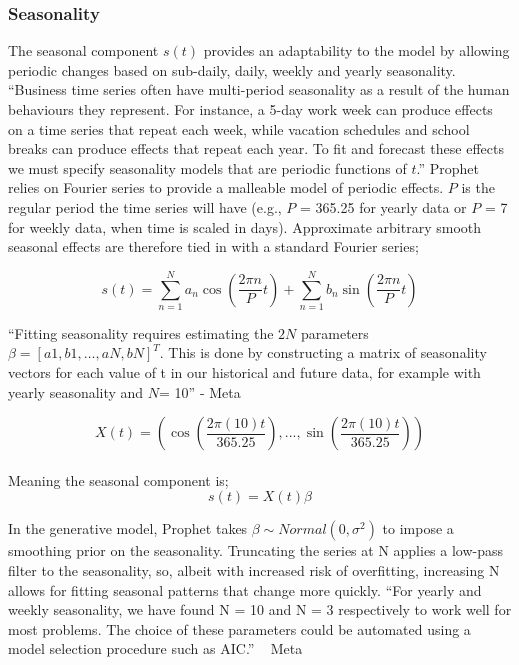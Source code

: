 \subsubsection{Seasonality}

The seasonal component $s(t)$ provides an adaptability to the model by allowing periodic changes based on sub-daily, daily, weekly and yearly seasonality.
“Business time series often have multi-period seasonality as a result of the human behaviours they represent. For instance, a 5-day work week can produce effects on a time series that repeat each week, while vacation schedules and school breaks can produce effects that repeat each year. To fit and forecast these effects we must specify seasonality models that are periodic functions of $t$.”
Prophet relies on Fourier series to provide a malleable model of periodic effects. $P$ is the regular period the time series will have (e.g., $P$ = 365.25 for yearly data or $P$ = 7 for weekly data, when time is scaled in days).
Approximate arbitrary smooth seasonal effects are therefore tied in with a standard Fourier series;

\begin{equation}
    s(t) = \sum_{n=1}^{N} {a_n} \cos \left( \frac{2\pi n}{P} t \right) + \sum_{n=1}^{N} b_n \sin \left( \frac{2\pi n}{P} t \right)
\end{equation}

“Fitting seasonality requires estimating the $2N$ parameters $\beta =[a1,b1,…,aN,bN]^T$. This is done by constructing a matrix of seasonality vectors for each value of t in our historical and future data, for example with yearly seasonality and $N$= 10” - Meta

\begin{equation}
    X(t) = (\cos(\frac{2\pi (10)t}{365.25}),...,\sin(\frac{2\pi (10)t}{365.25}) )
\end{equation} \\

Meaning the seasonal component is;
\begin{equation}
    s(t)=X(t)\beta 
\end{equation}

In the generative model, Prophet takes $\beta \sim Normal(0,\sigma^2)$ to impose a smoothing prior on the seasonality.
Truncating the series at N applies a low-pass filter to the seasonality, so, albeit with increased risk of overfitting, increasing N allows for fitting seasonal patterns that change more quickly.
“For yearly and weekly seasonality, we have found N = 10 and N = 3 respectively to work well for most problems. The choice of these parameters could be automated using a model selection procedure such as AIC.” ~ Meta

